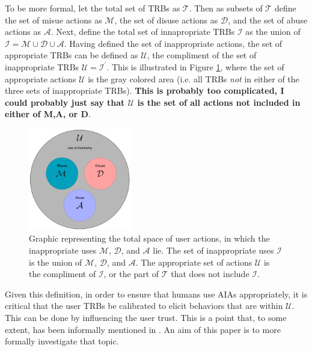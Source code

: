     To be more formal, let the total set of TRBs as $\mathcal{T}$. Then as subsets of $\mathcal{T}$ define the set of misue actions as $\mathcal{M}$, the set of disuse actions as $\mathcal{D}$, and the set of abuse actions as $\mathcal{A}$. Next, define the total set of innapropriate TRBs $\mathcal{I}$ as the union of $\mathcal{I} = \mathcal{M}\cup \mathcal{D}\cup\mathcal{A}$. Having defined the set of inappropriate actions, the set of appropriate TRBs can be defined as $\mathcal{U}$, the compliment of the set of inappropriate TRBs $\mathcal{U} = \mathcal{I}^\prime$. This is illustrated in Figure \ref{fig:appropriate_use}, where the set of appropriate actions $\mathcal{U}$ is the gray colored area (i.e. all TRBs \emph{not} in either of the three sets of inappropriate TRBs). \textbf{This is probably too complicated, I could probably just say that $\mathcal{U}$ is the set of all actions not included in either of M,A, or D}.
    
	\begin{figure}[htbp]
    	\centering
     	\includegraphics[width=0.4\textwidth]{Figures/misuse_disuse_abuse}
    	\caption{Graphic representing the total space of user actions, in which the inappropriate uses $\mathcal{M}$, $\mathcal{D}$, and $\mathcal{A}$ lie. The set of inappropriate uses $\mathcal{I}$ is the union of $\mathcal{M}$, $\mathcal{D}$, and $\mathcal{A}$. The appropriate set of actions $\mathcal{U}$ is the compliment of $\mathcal{I}$, or the part of $\mathcal{T}$ that does not include $\mathcal{I}$.}
        \label{fig:appropriate_use}
    \end{figure}
    
    Given this definition, in order to ensure that humans use AIAs appropriately, it is critical that the user TRBs be calibrated to elicit behaviors that are within $\mathcal{U}$. This can be done by influencing the user trust. This is a point that, to some extent, has been informally mentioned in \citet{Muir1994-ow,Muir1987-mk,Lillard2016-yg,Lee2004-pv,Hutchins2015-if}. An aim of this paper is to more formally investigate that topic.

